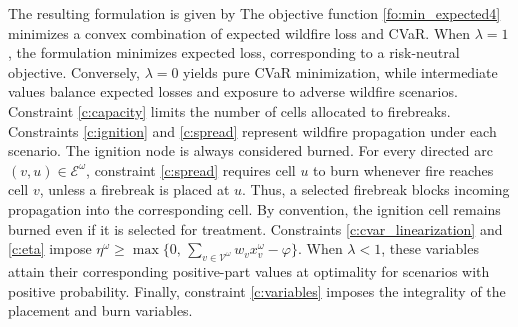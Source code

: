 \documentclass{itor}
\begin{document}
The resulting formulation is given by
%
The objective function \eqref{fo:min_expected4} minimizes
a convex combination of expected wildfire loss and CVaR.
When $\lambda=1$, the formulation minimizes expected loss,
corresponding to a risk-neutral objective. Conversely,
$\lambda=0$ yields pure CVaR minimization, while intermediate
values balance expected losses and exposure to adverse
wildfire scenarios. Constraint \eqref{c:capacity} limits the number of cells
allocated to firebreaks. Constraints \eqref{c:ignition}
and \eqref{c:spread} represent wildfire propagation
under each scenario. The ignition node is always considered
burned. For every directed arc
$(v,u)\in\mathcal{E}^\omega$, constraint
\eqref{c:spread} requires cell $u$ to burn whenever
fire reaches cell $v$, unless a firebreak is placed
at $u$. Thus, a selected firebreak blocks incoming
propagation into the corresponding cell. By convention,
the ignition cell remains burned even if it is
selected for treatment. Constraints \eqref{c:cvar_linearization} and
\eqref{c:eta} impose
$\eta^\omega\geq
\max\{
0,\,
\sum_{v\in\mathcal{V}^\omega}
w_vx_v^\omega-\varphi
\}$. When $\lambda<1$, these variables attain their
corresponding positive-part values at optimality
for scenarios with positive probability.
Finally, constraint \eqref{c:variables} imposes
the integrality of the placement and burn variables.
\end{document}
